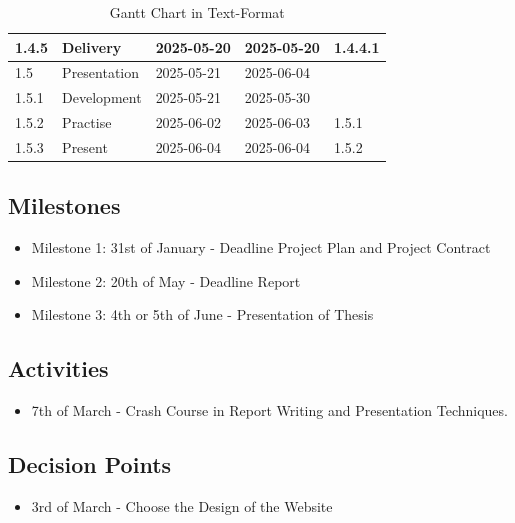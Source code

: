 \begin{table}[H]
\begin{tabular}{|l|l|l|l|l|}
        1.4.5 & Delivery & 2025-05-20 & 2025-05-20 & 1.4.4.1 \\ \hline
        1.5 & Presentation & 2025-05-21 & 2025-06-04 & ~ \\ \hline
        1.5.1 & Development & 2025-05-21 & 2025-05-30 & ~ \\ \hline
        1.5.2 & Practise & 2025-06-02 & 2025-06-03 & 1.5.1 \\ \hline
        1.5.3 & Present & 2025-06-04 & 2025-06-04 & 1.5.2 \\ \hline
    \end{tabular}
    \caption{Gantt Chart in Text-Format}
    \label{gantt_text}
\end{table}



\subsection{Milestones}
\begin{itemize}
    \item Milestone 1: 31st of January - Deadline Project Plan and Project Contract
    \item Milestone 2: 20th of May - Deadline Report
    \item Milestone 3: 4th or 5th of June - Presentation of Thesis
\end{itemize}

\subsection{Activities}
\begin{itemize}
    \item 7th of March - Crash Course in Report Writing and Presentation Techniques.
\end{itemize}

\subsection{Decision Points}
\begin{itemize}
    \item 3rd of March - Choose the Design of the Website
\end{itemize}
